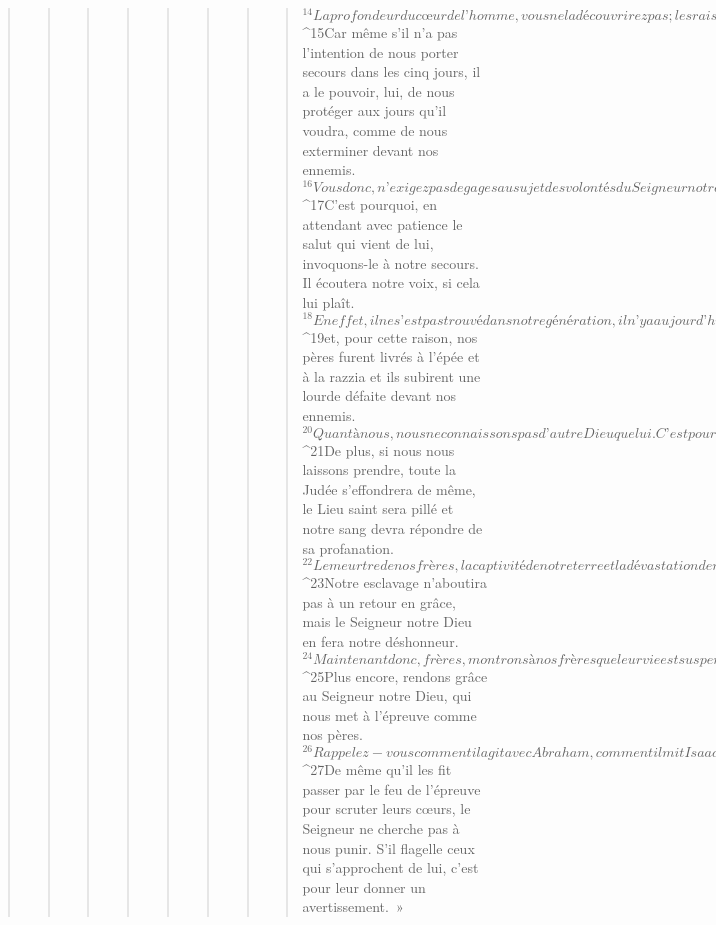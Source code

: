 \begin{verse}
\begin{verse}
\begin{verse}
\begin{verse}
\begin{verse}
\begin{verse}
\begin{verse}
\begin{verse}
${}^{14}La profondeur du cœur de l’homme, vous ne la découvrirez pas ; les raisonnements de son esprit, vous ne les saisirez pas. Comment donc pourrez-vous sonder le Dieu qui a fait tout cela, comprendre sa pensée et reconnaître son projet ? Non, frères, n’irritez pas le Seigneur notre Dieu ! 
${}^{15}Car même s’il n’a pas l’intention de nous porter secours dans les cinq jours, il a le pouvoir, lui, de nous protéger aux jours qu’il voudra, comme de nous exterminer devant nos ennemis.
${}^{16}Vous donc, n’exigez pas de gages au sujet des volontés du Seigneur notre Dieu. Car il n’est pas comme un homme, Dieu, pour qu’on lui adresse des menaces ; il n’est pas comme un fils d’homme, pour qu’on le soumette à l’arbitrage. 
${}^{17}C’est pourquoi, en attendant avec patience le salut qui vient de lui, invoquons-le à notre secours. Il écoutera notre voix, si cela lui plaît. 
${}^{18}En effet, il ne s’est pas trouvé dans notre génération, il n’y a aujourd’hui ni tribu, ni clan, ni bourg, ni ville qui se soient prosternés devant des dieux faits de main d’homme. Cela s’est produit autrefois 
${}^{19}et, pour cette raison, nos pères furent livrés à l’épée et à la razzia et ils subirent une lourde défaite devant nos ennemis. 
${}^{20}Quant à nous, nous ne connaissons pas d’autre Dieu que lui. C’est pourquoi nous gardons l’espoir qu’il ne nous méprisera pas, non plus que ceux de notre race.
${}^{21}De plus, si nous nous laissons prendre, toute la Judée s’effondrera de même, le Lieu saint sera pillé et notre sang devra répondre de sa profanation. 
${}^{22}Le meurtre de nos frères, la captivité de notre terre et la dévastation de notre héritage retomberont sur nos têtes au milieu des nations où nous connaîtrons l’esclavage, et nous serons un scandale et une honte face à nos conquérants. 
${}^{23}Notre esclavage n’aboutira pas à un retour en grâce, mais le Seigneur notre Dieu en fera notre déshonneur. 
${}^{24}Maintenant donc, frères, montrons à nos frères que leur vie est suspendue à la nôtre, et que le Lieu saint, la demeure de Dieu et l’autel dépendent de nous.
${}^{25}Plus encore, rendons grâce au Seigneur notre Dieu, qui nous met à l’épreuve comme nos pères. 
${}^{26}Rappelez-vous comment il agit avec Abraham, comment il mit Isaac à l’épreuve, et tout ce qui arriva à Jacob, en Mésopotamie de Syrie, lorsqu’il gardait le petit bétail de Laban, le frère de sa mère. 
${}^{27}De même qu’il les fit passer par le feu de l’épreuve pour scruter leurs cœurs, le Seigneur ne cherche pas à nous punir. S’il flagelle ceux qui s’approchent de lui, c’est pour leur donner un avertissement. »

\end{verse}
\end{verse}
\end{verse}
\end{verse}
\end{verse}
\end{verse}
\end{verse}
\end{verse}
